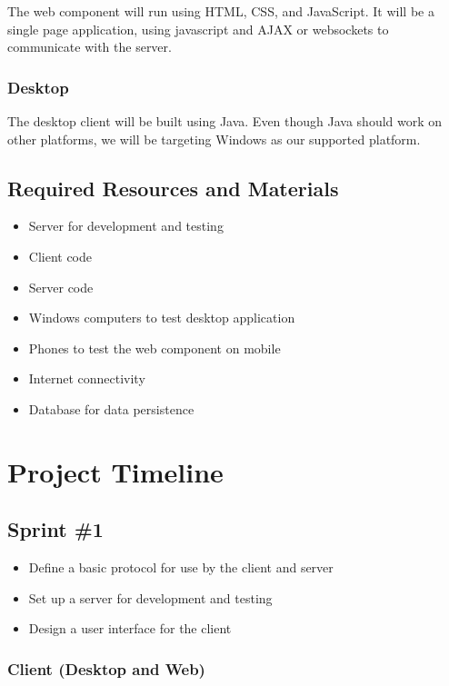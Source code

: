 \documentclass[11pt]{article}
\begin{document}
The web component will run using HTML, CSS, and JavaScript. It will be
a single page application, using javascript and AJAX or websockets to
communicate with the server.

\subsubsection{Desktop}
\label{sec-3-2-2}

The desktop client will be built using Java. Even though Java should
work on other platforms, we will be targeting Windows as our supported
platform.

\subsection{Required Resources and Materials}
\label{sec-3-3}

\begin{itemize}
\item Server for development and testing
\item Client code
\item Server code
\item Windows computers to test desktop application
\item Phones to test the web component on mobile
\item Internet connectivity
\item Database for data persistence
\end{itemize}

\section{Project Timeline}
\label{sec-4}

\subsection{Sprint \#1}
\label{sec-4-1}

\begin{itemize}
\item Define a basic protocol for use by the client and server
\item Set up a server for development and testing
\item Design a user interface for the client
\end{itemize}

\subsubsection{Client (Desktop and Web)}
\label{sec-4-1-1}
\end{document}
